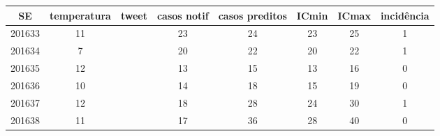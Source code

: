 \begin{tabular}{c|ccccccc}
  \hline
SE & temperatura & tweet & casos notif & casos preditos & ICmin & ICmax & incidência \\ 
  \hline
201633 & 11 &  & 23 & 24 & 23 & 25 & 1 \\ 
  201634 & 7 &  & 20 & 22 & 20 & 22 & 1 \\ 
  201635 & 12 &  & 13 & 15 & 13 & 16 & 0 \\ 
  201636 & 10 &  & 14 & 18 & 15 & 19 & 0 \\ 
  201637 & 12 &  & 18 & 28 & 24 & 30 & 1 \\ 
  201638 & 11 &  & 17 & 36 & 28 & 40 & 0 \\ 
   \hline
\end{tabular}
